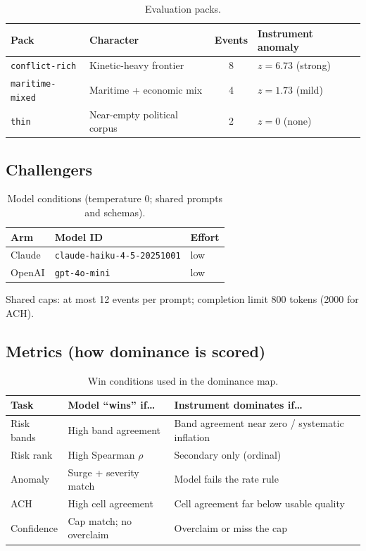 \documentclass[11pt,a4paper]{article}
\begin{document}
\begin{table}[t]
\centering
\caption{Evaluation packs.}
\label{tab:packs}
\begin{tabular}{@{}l l c l@{}}
\toprule
\textbf{Pack} & \textbf{Character} & \textbf{Events} & \textbf{Instrument anomaly} \\
\midrule
\texttt{conflict-rich} & Kinetic-heavy frontier & 8 & $z{=}6.73$ (strong) \\
\texttt{maritime-mixed} & Maritime + economic mix & 4 & $z{=}1.73$ (mild) \\
\texttt{thin} & Near-empty political corpus & 2 & $z{=}0$ (none) \\
\bottomrule
\end{tabular}
\end{table}

\subsection{Challengers}
\begin{table}[t]
\centering
\caption{Model conditions (temperature $0$; shared prompts and schemas).}
\label{tab:models}
\begin{tabular}{@{}lll@{}}
\toprule
\textbf{Arm} & \textbf{Model ID} & \textbf{Effort} \\
\midrule
Claude & \texttt{claude-haiku-4-5-20251001} & low \\
OpenAI & \texttt{gpt-4o-mini} & low \\
\bottomrule
\end{tabular}
\end{table}

\noindent
Shared caps: at most 12 events per prompt; completion limit 800 tokens (2000 for ACH).

\subsection{Metrics (how dominance is scored)}
\begin{table}[t]
\centering
\begin{threeparttable}
\caption{Win conditions used in the dominance map.}
\label{tab:metrics}
\begin{tabular}{@{}p{2.2cm}p{5.2cm}p{5.2cm}@{}}
\toprule
\textbf{Task} & \textbf{Model ``wins'' if\ldots} & \textbf{Instrument dominates if\ldots} \\
\midrule
Risk bands & High band agreement & Band agreement near zero / systematic inflation \\
Risk rank & High Spearman $\rho$ & Secondary only (ordinal) \\
Anomaly & Surge + severity match & Model fails the rate rule \\
ACH & High cell agreement & Cell agreement far below usable quality \\
Confidence & Cap match; no overclaim & Overclaim or miss the cap \\
\bottomrule
\end{tabular}
\end{threeparttable}
\end{table}
\end{document}
